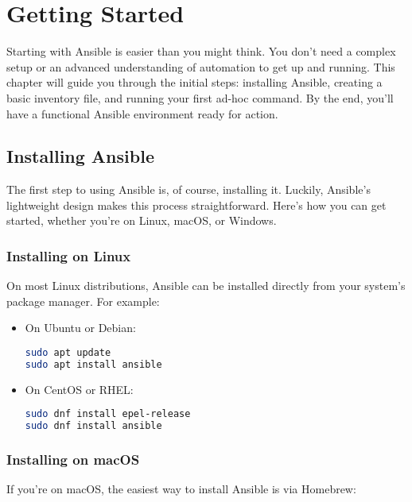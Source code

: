 \chapter{Getting Started}

Starting with Ansible is easier than you might think. You don't need a complex setup or an advanced understanding of automation to get up and running. This chapter will guide you through the initial steps: installing Ansible, creating a basic inventory file, and running your first ad-hoc command. By the end, you'll have a functional Ansible environment ready for action.

\section{Installing Ansible}

The first step to using Ansible is, of course, installing it. Luckily, Ansible's lightweight design makes this process straightforward. Here's how you can get started, whether you're on Linux, macOS, or Windows.

\subsection{Installing on Linux}

On most Linux distributions, Ansible can be installed directly from your system's package manager. For example:

\begin{itemize}
    \item On Ubuntu or Debian:
    \begin{lstlisting}[language=bash, caption=Install Ansible on Ubuntu/Debian]
sudo apt update
sudo apt install ansible
    \end{lstlisting}

    \item On CentOS or RHEL:
    \begin{lstlisting}[language=bash, caption=Install Ansible on CentOS/RHEL]
sudo dnf install epel-release
sudo dnf install ansible
    \end{lstlisting}
\end{itemize}

\subsection{Installing on macOS}

If you're on macOS, the easiest way to install Ansible is via Homebrew:

